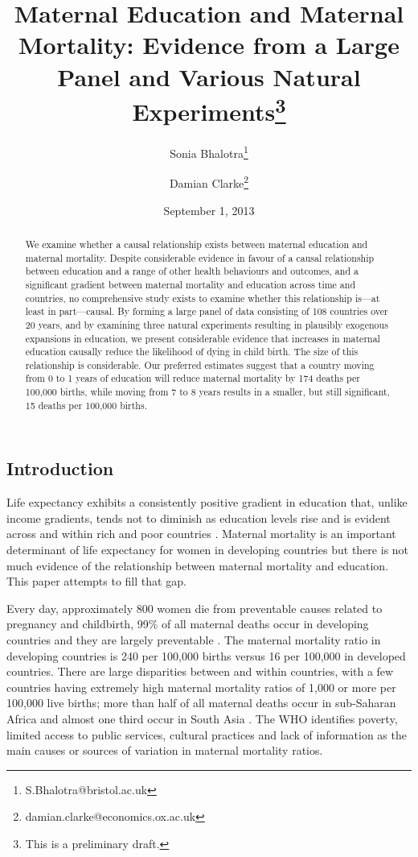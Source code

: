 \documentclass{article}[12pt,subeqn]
\title{Maternal Education and Maternal Mortality: Evidence from a Large Panel and Various Natural Experiments\footnote{This is a preliminary draft.}}
\author{Sonia Bhalotra\thanks{S.Bhalotra@bristol.ac.uk}
\and{Damian Clarke\thanks{damian.clarke@economics.ox.ac.uk}}}
\date{September 1, 2013}
\begin{document}
\begin{spacing}{1.4}

\maketitle

\begin{abstract}
We examine whether a causal relationship exists between maternal education and maternal mortality.  
Despite considerable evidence in favour of a causal relationship between education and a range of 
other health behaviours and outcomes, and a significant gradient between maternal mortality and 
education across time and countries, no comprehensive study exists to examine whether this relationship 
is---at least in part---causal.  By forming a large panel of data consisting of 108 countries over 
20 years, and by examining three natural experiments resulting in plausibly exogenous expansions 
in education, we present considerable evidence that increases in maternal education causally reduce the 
likelihood of dying in child birth.  The size of this relationship is considerable.  Our preferred
estimates suggest that a country moving from 0 to 1 years of education will reduce maternal mortality
by 174 deaths per 100,000 births, while moving from 7 to 8 years results in a smaller, but still 
significant, 15 deaths per 100,000 births.
\end{abstract}

\section{Introduction}
Life expectancy exhibits a consistently positive gradient in education that, unlike income gradients, tends not
to diminish as education levels rise and is evident across and within rich and poor countries 
\citep{RichardsBarry1998, KunstMackenbach1994, EloPreston1996, LlerasMuney2005, Mearaetal2008}. 
Maternal mortality is an important determinant of life expectancy for women in
developing countries but there is not much evidence of the relationship between maternal mortality and
education. This paper attempts to fill that gap.

Every day, approximately 800 women die from preventable causes related to pregnancy and childbirth, 99\%
of all maternal deaths occur in developing countries and they are largely preventable \citep{WHO2012}. The
maternal mortality ratio in developing countries is 240 per 100,000 births versus 16 per 100,000 in
developed countries. There are large disparities between and within countries, with a few countries having
extremely high maternal mortality ratios of 1,000 or more per 100,000 live births; more than half of all
maternal deaths occur in sub-Saharan Africa and almost one third occur in South Asia \citep{WHO2012}. The
WHO identifies poverty, limited access to public services, cultural practices and lack of information as the
main causes or sources of variation in maternal mortality ratios.


\end{spacing}
\end{document}
